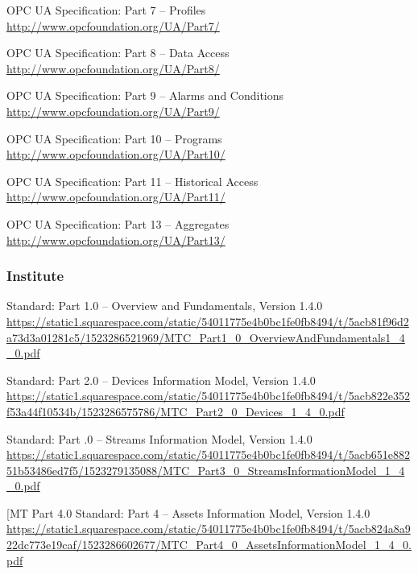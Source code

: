 \hang [UA Part 7]	OPC UA Specification: Part 7 -- Profiles \\
\url{http://www.opcfoundation.org/UA/Part7/}

\hang [UA Part 8]	OPC UA Specification: Part 8 -- Data Access \\
\url{http://www.opcfoundation.org/UA/Part8/}

\hang [UA Part 9]	OPC UA Specification: Part 9 -- Alarms and Conditions \\
\url{http://www.opcfoundation.org/UA/Part9/}

\hang [UA Part 10]	OPC UA Specification: Part 10 -- Programs \\
\url{http://www.opcfoundation.org/UA/Part10/}

\hang [UA Part 11]	OPC UA Specification: Part 11 -- Historical Access \\
\url{http://www.opcfoundation.org/UA/Part11/}

\hang [UA Part 13]	OPC UA Specification: Part 13 -- Aggregates \\
\url{http://www.opcfoundation.org/UA/Part13/}

\subsubsection{\mtconnect Institute}

\hang [MT Part 1.0]	\mtconnect Standard: Part 1.0 -- Overview and Fundamentals, Version 1.4.0 \\
\url{https://static1.squarespace.com/static/54011775e4b0bc1fe0fb8494/t/5acb81f96d2a73d3a01281c5/1523286521969/MTC_Part1_0_OverviewAndFundamentals1_4_0.pdf}

\hang [MT Part 2.0]	\mtconnect Standard: Part 2.0 -- Devices Information Model, Version 1.4.0 \\
\url{https://static1.squarespace.com/static/54011775e4b0bc1fe0fb8494/t/5acb822e352f53a44f10534b/1523286575786/MTC_Part2_0_Devices_1_4_0.pdf}

\hang [MT Part 3.0]	\mtconnect Standard: Part .0 -- Streams Information Model, Version 1.4.0 \\
\url{https://static1.squarespace.com/static/54011775e4b0bc1fe0fb8494/t/5acb651e88251b53486ed7f5/1523279135088/MTC_Part3_0_StreamsInformationModel_1_4_0.pdf}

\hang [MT Part 4.0	\mtconnect Standard: Part 4 -- Assets Information Model, Version 1.4.0 \\
\url{https://static1.squarespace.com/static/54011775e4b0bc1fe0fb8494/t/5acb824a8a922dc773e19caf/1523286602677/MTC_Part4_0_AssetsInformationModel_1_4_0.pdf}


